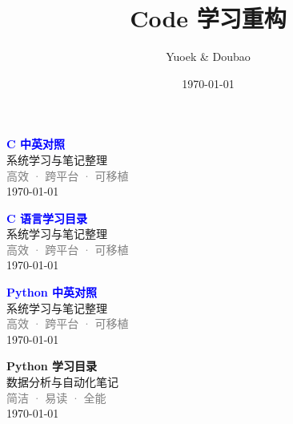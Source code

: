 \documentclass[UTF8, a4paper, 12pt]{ctexart}
\title{\Large Code 学习重构}
\author{Yuoek \& Doubao}
\date{\today}
\begin{document}
\maketitle
\tableofcontents
\clearpage

\thispagestyle{empty}
\vspace*{\fill}
\begin{center}
    \textcolor{blue}{\Huge\textbf{C 中英对照}} \\[1em]
    \textcolor{blue!60!black}{\Large 系统学习与笔记整理} \\[2em]
    \textcolor{gray}{\large 高效 · 跨平台 · 可移植} \\[1em]
    \today
\end{center}
\vspace*{\fill}
\clearpage


\clearpage
\thispagestyle{empty}
\vspace*{\fill}
\begin{center}
    \textcolor{blue}{\Huge\textbf{C 语言学习目录}} \\[1em]
    \textcolor{blue!60!black}{\Large 系统学习与笔记整理} \\[2em]
    \textcolor{gray}{\large 高效 · 跨平台 · 可移植} \\[1em]
    \today
\end{center}
\vspace*{\fill}
\clearpage


\clearpage


\thispagestyle{empty}
\vspace*{\fill}
\begin{center}
    \textcolor{blue}{\Huge\textbf{Python 中英对照}} \\[1em]
    \textcolor{blue!60!black}{\Large 系统学习与笔记整理} \\[2em]
    \textcolor{gray}{\large 高效 · 跨平台 · 可移植} \\[1m]
    \today
\end{center}
\vspace*{\fill}
\clearpage


\clearpage
\thispagestyle{empty}
\vspace*{\fill}
\begin{center}
    \textcolor{green!70!black}{\Huge\textbf{Python 学习目录}} \\[1em]
    \textcolor{green!40!black}{\Large 数据分析与自动化笔记} \\[2em]
    \textcolor{gray}{\large 简洁 · 易读 · 全能} \\[1em]
    \today
\end{center}
\vspace*{\fill}
\clearpage
\end{document}
